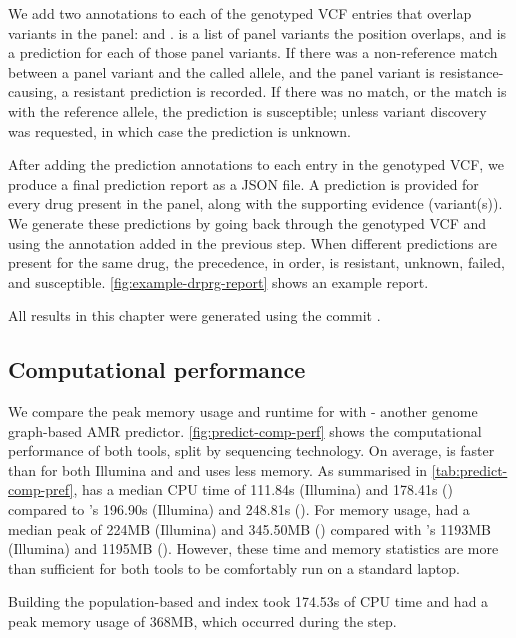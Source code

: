 We add two annotations to each of the genotyped VCF entries that overlap variants in the panel:  and .  is a list of panel variants the position overlaps, and  is a prediction for each of those panel variants. If there was a non-reference match between a panel variant and the called allele, and the panel variant is resistance-causing, a resistant prediction is recorded. If there was no match, or the match is with the reference allele, the prediction is susceptible; unless variant discovery was requested, in which case the prediction is unknown. 

After adding the prediction annotations to each entry in the genotyped VCF, we produce a final prediction report as a JSON file. A prediction is provided for every drug present in the panel, along with the supporting evidence (variant(s)). We generate these predictions by going back through the genotyped VCF and using the  annotation added in the previous step. When different predictions are present for the same drug, the precedence, in order, is resistant, unknown, failed, and susceptible. \autoref{fig:example-drprg-report} shows an example report.

\noindent
All \drprg{} results in this chapter were generated using the commit \href{https://github.com/mbhall88/drprg/tree/cb4f9b82b5d03de45b8016ae5d54bbce7a8f3a0f}{}.

\subsection{Computational performance}
\label{sec:drprg-comp-perf}

We compare the peak memory usage and runtime for \drprg{}  with \mykrobe{} - another genome graph-based AMR predictor. \autoref{fig:predict-comp-perf} shows the computational performance of both tools, split by sequencing technology. On average, \drprg{} is faster than \mykrobe{} for both Illumina and \ont{} and uses less memory. As summarised in \autoref{tab:predict-comp-pref}, \drprg{} has a median CPU time of 111.84s (Illumina) and 178.41s (\ont{}) compared to \mykrobe{}'s 196.90s (Illumina) and 248.81s (\ont{}). For memory usage, \drprg{} had a median peak of 224MB (Illumina) and 345.50MB (\ont{}) compared with \mykrobe{}'s 1193MB (Illumina) and 1195MB (\ont{}). However, these time and memory statistics are more than sufficient for both tools to be comfortably run on a standard laptop. 

Building the \drprg{} population-based \panrg{} and index took 174.53s of CPU time and had a peak memory usage of 368MB, which occurred during the \makeprg{} step.

